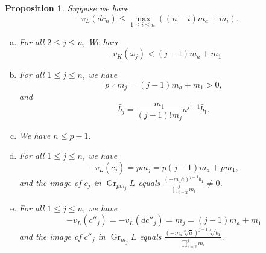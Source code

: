 \documentclass[10pt,a4paper]{amsart}
\numberwithin{equation}{section}
\newcommand{\Gr}{\operatorname{Gr}}
\theoremstyle{plain}
\newtheorem{prop}[theo]{Proposition}
\theoremstyle{definition}
\begin{document}
\begin{prop}\label{lae}
  Suppose we have
  \begin{equation}\label{et}
  -v_L(dc_n)\leq \max_{1\leq i\leq n}((n-i)m_a+m_{i}).
  \end{equation}
  \begin{enumerate}[(a)]
    \item\label{lae-1} For all $2\leq j\leq n$, We have
  \begin{equation}\label{aee}
    -v_K(\omega_j)<(j-1)m_a+m_1
  \end{equation}
\item\label{lae-2} For all $1\leq j\leq n$, we have
  \begin{equation}\label{ei}
  p\nmid m_j=(j-1)m_a+m_1>0,
\end{equation}
and
\begin{equation}\label{eq}
\bar{b}_j=\frac{m_1}{(j-1)!m_j}\bar{a}^{j-1}\bar{b}_1.
\end{equation}
\item\label{lae-5} We have $n\leq p-1$.
\item\label{lae-3} For all $1\leq j\leq n$, we have
  \begin{equation}\label{er}
  -v_L(c_j)=pm_j=p(j-1)m_a+pm_1,
  \end{equation}
  and the image of $c_j$ in $\Gr_{pm_j}L$ equals $\displaystyle{\frac{(-m_a\bar{a})^{j-1}\bar{b}_1}{\prod_{i=2}^jm_i}\neq 0}$.
\item\label{lae-4}
  For all $1\leq j\leq n$, we have
  \begin{equation}\label{es}
  -v_L(c''_j)=-v_L(dc''_j)=m_j=(j-1)m_a+m_1
  \end{equation}
  and the image of $c''_j$ in $\Gr_{m_j}L$ equals $\displaystyle{\frac{\left(-m_a\sqrt[p]{\bar{a}}\right)^{j-1}\sqrt[p]{\bar{b}_1}}{\prod_{i=2}^jm_i}}$.
  \end{enumerate}
\end{prop}
\end{document}
